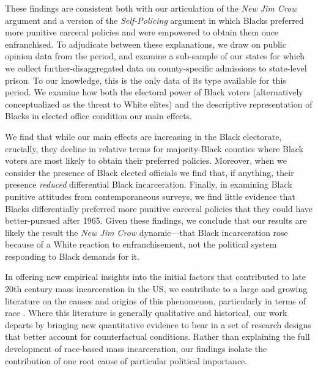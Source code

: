 \documentclass[12pt]{article}
\begin{document}
These findings are consistent both with our articulation of the \emph{New Jim Crow} argument and a version of the \emph{Self-Policing} argument in which Blacks preferred more punitive carceral policies and were empowered to obtain them once enfranchised.  To adjudicate between these explanations, we draw on public opinion data from the period, and examine a sub-sample of our states for which we collect further-disaggregated data on county-specific admissions to state-level prison.  To our knowledge, this is the only data of its type available for this period.  We examine how both the electoral power of Black voters (alternatively conceptualized as the threat to White elites) and the descriptive representation of Blacks in elected office condition our main effects.

We find that while our main effects are increasing in the Black electorate, crucially, they decline in relative terms for majority-Black counties where Black voters are most likely to obtain their preferred policies.  Moreover, when we consider the presence of Black elected officials we find that, if anything, their presence \emph{reduced} differential Black incarceration.  Finally, in examining Black punitive attitudes from contemporaneous surveys, we find little evidence that Blacks differentially preferred more punitive carceral policies that they could have better-pursued after 1965. Given these findings, we conclude that our results are likely the result the \emph{New Jim Crow} dynamic---that Black incarceration rose because of a White reaction to enfranchisement, not the political system responding to Black demands for it.

In offering new empirical insights into the initial factors that contributed to late 20th century mass incarceration in the US, we contribute to a large and growing literature on the causes and origins of this phenomenon, particularly in terms of race \citep{Gottschalk:2006ub,Alexander:2012tj,Murakawa:2014vj,Hinton:2016tb,Pfaff:2017tp,Gottschalk:2008um,Soss:2017wx,Beckett:2020cw}.  Where this literature is generally qualitative and historical, our work departs by bringing new quantitative evidence to bear in a set of research designs that better account for counterfactual conditions.  Rather than explaining the full development of race-based mass incarceration, our findings isolate the contribution of one root cause of particular political importance.
\end{document}
